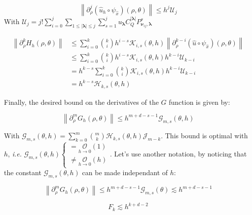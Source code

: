 ﻿\documentclass{article}
\begin{document}
\begin{lemma}\label{u-hat-psi-derivatives-bound}
  \begin{equation}
    \left\|\partial_\rho^j(\hat u_h\circ\psi_{\hat x})(\rho, \theta)\right\| \leq h^j\mathcal U_j
  \end{equation}
  With $\displaystyle{\mathcal U_j = j!\sum_{i=0}^{j}\sum_{1\leq|\bm\lambda|\leq j}\sum_{s=1}^{j}u_{\bm\lambda}C_Q^{|\bm\lambda|}P^s_{\bm\nu_{ij}, \bm\lambda}}$
\end{lemma}

\begin{align*}
  \left\|\partial_\rho^k H_h(\rho, \theta)\right\| & \leq \sum_{i=0}^{k}\binom{k}{i}h^{i-s}\mathcal K_{i,s}(\theta, h)\left\|\partial_\rho^{k-i}(\hat u\circ\psi_{\hat x})(\rho, \theta)\right\| \\
  & \leq \sum_{i=0}^{k}\binom{k}{i}h^{i-s}\mathcal K_{i,s}(\theta, h)h^{k-i}\mathcal U_{k-i} \\
  & = h^{k-s}\sum_{i=0}^{k}\binom{k}{i}\mathcal K_{i,s}(\theta, h)h^{k-i}\mathcal U_{k-i} \\
  & = h^{k-s}\mathcal H_{k,s}(\theta, h)
\end{align*}

Finally, the desired bound on the derivatives of the $G$ function is given by:

\begin{equation}
  \boxed{
    \left\|\partial^m_\rho G_h(\rho, \theta)\right\| \leq h^{m+d-s-1}\mathcal G_{m,s}(\theta, h)
  }
\end{equation}

With $\displaystyle{\mathcal G_{m,s}(\theta, h) = \sum_{k=0}^{m}\binom{m}{k}\mathcal H_{k,s}(\theta, h)\mathcal J_{m-k}}$. This bound is optimal with $h$, \textit{i.e.} $\displaystyle{\mathcal G_{m,s}(\theta, h)\begin{cases}
    =\underset{h\to 0}{\mathcal O}(1)\\
    \neq\underset{h\to 0}{\mathcal O}(h)
  \end{cases}}$. Let's use another notation, by noticing that the constant $\mathcal G_{m,s}(\theta, h)$ can be made independant of $h$:

\begin{equation}
  \left\|\partial^m_\rho G_h(\rho, \theta)\right\| \leq h^{m+d-s-1}\mathcal G_{m,s}(\theta) \lesssim h^{m+d-s-1}
\end{equation}

\begin{corollary}
  \begin{equation}
    F_k \lesssim h^{k+d-2}
  \end{equation}
\end{corollary}
\end{document}
